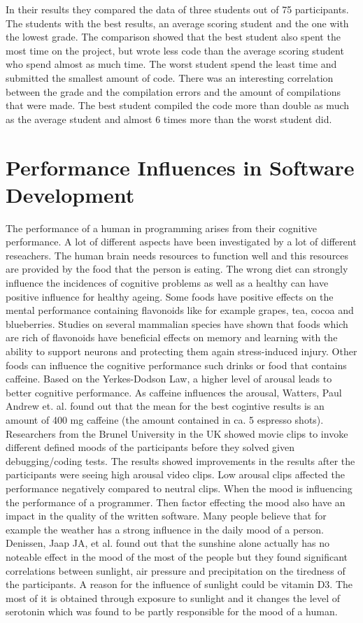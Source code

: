 In their results they compared the data of three students out of 75 participants. The students with the best results, an average scoring student and the one with the lowest grade. 
The comparison showed that the best student also spent the most time on the project, but wrote less code than the average scoring student who spend almost as much time. The worst student spend the least time and submitted the smallest amount of code. There was an interesting correlation between the grade and the compilation errors and the amount of compilations that were made. The best student compiled the code more than double as much as the average student and almost 6 times more than the worst student did. \cite{norris2008clockit}

\section{Performance Influences in Software Development}
The performance of a human in programming arises from their cognitive performance. A lot of different aspects have been investigated by a lot of different reseachers. The human brain needs resources to function well and this resources are provided by the food that the person is eating. The wrong diet can strongly influence the incidences of cognitive problems as well as a healthy can have positive influence for healthy ageing. Some foods have positive effects on the mental performance containing flavonoids like for example grapes, tea, cocoa and blueberries. 
Studies on several mammalian species have shown that foods which are rich of flavonoids have beneficial effects on memory and learning with the ability to support neurons and protecting them again stress-induced injury. \cite{spencer2008food}
Other foods can influence the cognitive performance such drinks or food that contains caffeine.
Based on the Yerkes-Dodson Law, a higher level of arousal leads to better cognitive performance. As caffeine influences the arousal, Watters, Paul Andrew et. al. \cite{watters1997caffeine} found out that the mean for the best cogintive results is an amount of 400 mg caffeine (the amount contained in ca. 5 espresso shots).
Researchers from the Brunel University in the UK showed movie clips to invoke different defined moods of the participants before they solved given debugging/coding tests. The results showed improvements in the results after the participants were seeing high arousal video clips. Low arousal clips affected the performance negatively compared to neutral clips. \cite{khan2007mood}
When the mood is influencing the performance of a programmer. Then factor effecting the mood also have an impact in the quality of the written software. Many people believe that for example the weather has a strong influence in the daily mood of a person. Denissen, Jaap JA, et al. \cite{denissen2008effects} found out that the sunshine alone actually has no noteable effect in the mood of the most of the people but they found significant correlations between sunlight, air pressure and precipitation on the tiredness of the participants.
A reason for the influence of sunlight could be vitamin D3. The most of it is obtained through exposure to sunlight and it changes the level of serotonin which was found to be partly responsible for the mood of a human. 

